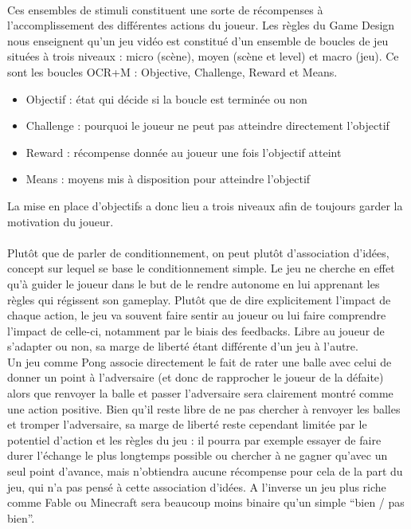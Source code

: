 \paragraph{}
Ces ensembles de stimuli constituent une sorte de récompenses à l’accomplissement des différentes actions du joueur. Les règles du Game Design nous enseignent qu’un jeu vidéo est constitué d’un ensemble de boucles de jeu situées à trois niveaux : micro (scène), moyen (scène et level) et macro (jeu). Ce sont les boucles OCR+M : Objective, Challenge, Reward et Means.
\begin{itemize}
	\item Objectif : état qui décide si la boucle est terminée ou non
	\item Challenge : pourquoi le joueur ne peut pas atteindre directement l’objectif
	\item Reward : récompense donnée au joueur une fois l’objectif atteint
	\item Means : moyens mis à disposition pour atteindre l’objectif
\end{itemize}
La mise en place d’objectifs a donc lieu a trois niveaux afin de toujours garder la motivation du joueur.

\paragraph{}
Plutôt que de parler de conditionnement, on peut plutôt d’association d’idées, concept sur lequel se base le conditionnement simple. Le jeu ne cherche en effet qu’à guider le joueur dans le but de le rendre autonome en lui apprenant les règles qui régissent son gameplay. Plutôt que de dire explicitement l’impact de chaque action, le jeu va souvent faire sentir au joueur ou lui faire comprendre l’impact de celle-ci, notamment par le biais des feedbacks. Libre au joueur de s’adapter ou non, sa marge de liberté étant différente d’un jeu à l’autre.\\
Un jeu comme Pong associe directement le fait de rater une balle avec celui de donner un point à l’adversaire (et donc de rapprocher le joueur de la défaite) alors que renvoyer la balle et passer l’adversaire sera clairement montré comme une action positive. Bien qu’il reste libre de ne pas chercher à renvoyer les balles et tromper l’adversaire, sa marge de liberté reste cependant limitée par le potentiel d’action et les règles du jeu : il pourra par exemple essayer de faire durer l’échange le plus longtemps possible ou chercher à ne gagner qu’avec un seul point d’avance, mais n’obtiendra aucune récompense pour cela de la part du jeu, qui n’a pas pensé à cette association d’idées. A l’inverse un jeu plus riche comme Fable ou Minecraft sera beaucoup moins binaire qu’un simple “bien / pas bien”.

